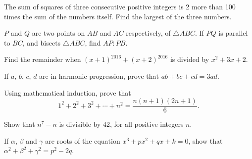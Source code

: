 \begin{problems}
    \problem The sum of squares of three consecutive positive integers is 2 more
    than 100 times the sum of the numbers itself. Find the largest of the three
    numbers.

    \problem $P$ and $Q$ are two points on $AB$ and $AC$ respectively, of
    $\triangle ABC$. If $PQ$ is parallel to $BC$, and bisects $\triangle ABC$,
    find $AP : PB$.

    \problem Find the remainder when $(x + 1)^{2016} + (x + 2)^{2016}$ is
    divided by $x^2 + 3x + 2$.

    \problem If $a$, $b$, $c$, $d$ are in harmonic progression, prove that $ab +
    bc + cd = 3ad$.

    \problem Using mathematical induction, prove that 
    \[1^2 + 2^2 + 3^2 + \cdots + n^2 = \frac{n(n + 1)(2n + 1)}{6}.\]

    \problem Show that $n^7 - n$ is divisible by 42, for all positive integers
    $n$.

    \problem If $\alpha$, $\beta$ and $\gamma$ are roots of the equation $x^3 +
    px^2 + qx + k = 0$, show that $\alpha^2 + \beta^2 + \gamma^2 = p^2 - 2q$.
\end{problems}
